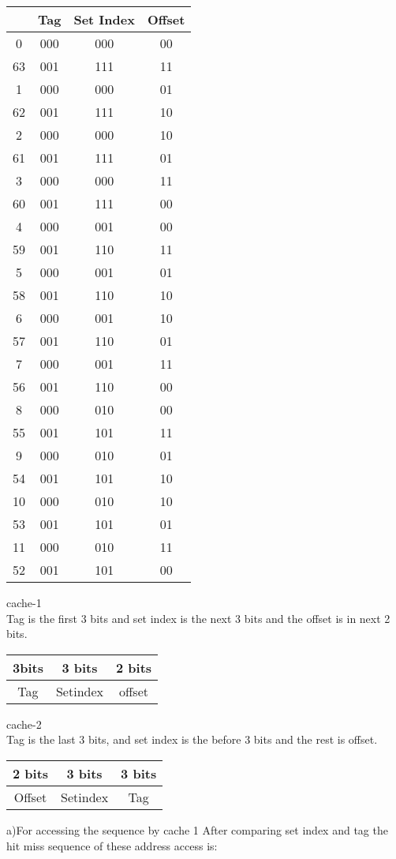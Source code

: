 \documentclass[12pt]{article}
\begin{document}
\begin{enumerate}
	
	\begin{center}
		\begin{tabular}{ |c|c|c|c| } 
			\hline
			& Tag & Set Index  & Offset \\
			\hline
			0 & 000 & 000 & 00\\
			63&001&111&11\\
			1&000&000&01\\
			62&001&111&10\\
			2&000&000&10\\
			61&001&111&01\\
			3&000&000&11\\
			60&001&111&00\\
			4&000&001&00\\
			59&001&110&11 \\
			5 &000&001&01\\
			58 &001&110&10\\
			6 &000&001&10\\
			57 &001&110&01\\
			7 &000&001&11\\
			56 &001&110&00\\
			8 &000&010&00\\
			55 &001&101&11\\
			9 &000&010&01\\
			54 &001&101&10\\
			10&000&010&10\\
			53&001&101&01\\
			11 &000&010&11\\
			52&001&101&00\\
			\hline
		\end{tabular}
	\end{center}
	cache-1 \\ 
	Tag is the first 3 bits and set index is the next 3 bits and the offset is in next 2 bits.\\
	
	
	\begin{center}
		\begin{tabular}{ |c|c|c| } 
			\hline
			3bits & 3 bits & 2 bits \\ 
			\hline
			Tag & Setindex & offset \\  
			\hline
		\end{tabular}
	\end{center}
	
	cache-2\\
	Tag is the last 3 bits, and set index is the before 3 bits and the rest is offset.
	\begin{center}
		\begin{tabular}{ |c|c|c| } 
			\hline
			2 bits & 3 bits & 3 bits \\ 
			\hline
			Offset & Setindex & Tag \\  
			\hline
		\end{tabular}
	\end{center}
	a)For accessing the sequence by cache 1 
	After comparing set index and tag the hit miss sequence of these address access is:\\
	

\end{enumerate}
\end{document}

